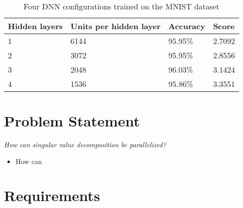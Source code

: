 \begin{table}[H]
  \centering
    \begin{tabular}{|l|l|l|l|} \hline
      Hidden layers & Units per hidden layer & Accuracy & Score \\ \hline
      1 & 6144 & 95.95\% & 2.7092 \\ \hline
      2 & 3072 & 95.95\% & 2.8556 \\ \hline
      3 & 2048 & 96.03\% & 3.1424 \\ \hline
      4 & 1536 & 95.86\% & 3.3551 \\ \hline
    \end{tabular}
    \caption{Four DNN configurations trained on the MNIST dataset}
    \label{tab:dnn:score}
  \end{table}



\section{Problem Statement}

\textit{How can singular value decomposition be parallelized?}

\begin{itemize}
\item How can 
\end{itemize}

\section{Requirements}

